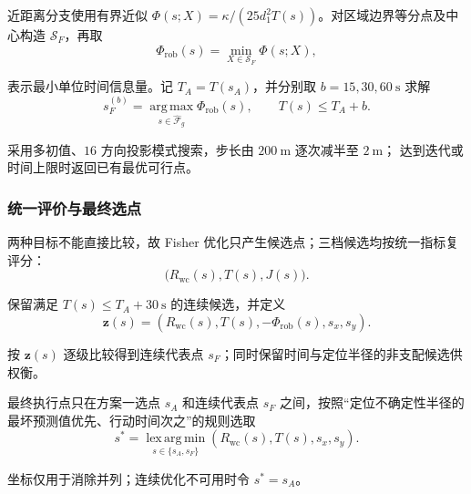 近距离分支使用有界近似 $\Phi(s;X)=\kappa/(25d_1^2T(s))$。对区域边界等分点及中心构造
$\mathcal S_F$，再取
\begin{equation}
  \Phi_{\mathrm{rob}}(s)
  =\min_{X\in\mathcal S_F}\Phi(s;X),
  \label{eq:q2-robust-fim}
\end{equation}

表示最小单位时间信息量。记 $T_A=T(s_A)$，并分别取
$b=15,30,60\ \mathrm{s}$ 求解
\begin{equation}
  s_F^{(b)}
  =\operatorname*{arg\,max}_{s\in\widehat{\mathcal F}_g}
  \Phi_{\mathrm{rob}}(s),
  \qquad T(s)\leq T_A+b.
  \label{eq:q2-fim-budget}
\end{equation}

采用多初值、$16$ 方向投影模式搜索，步长由 $200\ \mathrm m$ 逐次减半至 $2\ \mathrm m$；
达到迭代或时间上限时返回已有最优可行点。
\subsubsection{统一评价与最终选点}

两种目标不能直接比较，故 Fisher 优化只产生候选点；三档候选均按统一指标复评分：
\begin{equation}
  \bigl(R_{\mathrm{wc}}(s),T(s),J(s)\bigr).
\end{equation}

保留满足 $T(s)\leq T_A+30\ \mathrm{s}$ 的连续候选，并定义
\begin{equation}
  \boldsymbol z(s)=\left(R_{\mathrm{wc}}(s),T(s),
  -\Phi_{\mathrm{rob}}(s),s_x,s_y\right).
\end{equation}

按 $\boldsymbol z(s)$ 逐级比较得到连续代表点 $s_F$；同时保留时间与定位半径的非支配候选供权衡。

最终执行点只在方案一选点 $s_A$ 和连续代表点 $s_F$ 之间，按照“定位不确定性半径的最坏预测值优先、行动时间次之”的规则选取
\begin{equation}
  s^*=\operatorname*{lex\,arg\,min}_{s\in\{s_A,s_F\}}
  \left(R_{\mathrm{wc}}(s),T(s),s_x,s_y\right).
  \label{eq:q2-final-choice}
\end{equation}

坐标仅用于消除并列；连续优化不可用时令 $s^*=s_A$。

